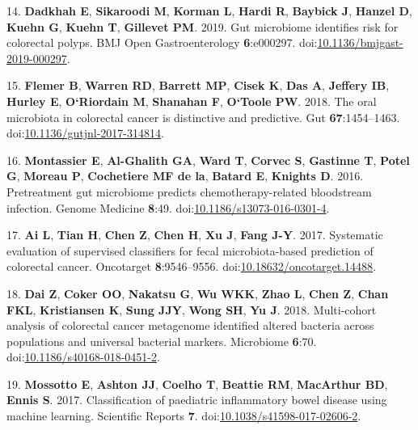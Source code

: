 \documentclass[11pt,]{article}
\begin{document}
\hypertarget{ref-dadkhah_gut_2019}{}
14. \textbf{Dadkhah E}, \textbf{Sikaroodi M}, \textbf{Korman L},
\textbf{Hardi R}, \textbf{Baybick J}, \textbf{Hanzel D}, \textbf{Kuehn
G}, \textbf{Kuehn T}, \textbf{Gillevet PM}. 2019. Gut microbiome
identifies risk for colorectal polyps. BMJ Open Gastroenterology
\textbf{6}:e000297.
doi:\href{https://doi.org/10.1136/bmjgast-2019-000297}{10.1136/bmjgast-2019-000297}.

\hypertarget{ref-flemer_oral_2018}{}
15. \textbf{Flemer B}, \textbf{Warren RD}, \textbf{Barrett MP},
\textbf{Cisek K}, \textbf{Das A}, \textbf{Jeffery IB}, \textbf{Hurley
E}, \textbf{O`Riordain M}, \textbf{Shanahan F}, \textbf{O`Toole PW}.
2018. The oral microbiota in colorectal cancer is distinctive and
predictive. Gut \textbf{67}:1454--1463.
doi:\href{https://doi.org/10.1136/gutjnl-2017-314814}{10.1136/gutjnl-2017-314814}.

\hypertarget{ref-montassier_pretreatment_2016}{}
16. \textbf{Montassier E}, \textbf{Al-Ghalith GA}, \textbf{Ward T},
\textbf{Corvec S}, \textbf{Gastinne T}, \textbf{Potel G}, \textbf{Moreau
P}, \textbf{Cochetiere MF de la}, \textbf{Batard E}, \textbf{Knights D}.
2016. Pretreatment gut microbiome predicts chemotherapy-related
bloodstream infection. Genome Medicine \textbf{8}:49.
doi:\href{https://doi.org/10.1186/s13073-016-0301-4}{10.1186/s13073-016-0301-4}.

\hypertarget{ref-ai_systematic_2017}{}
17. \textbf{Ai L}, \textbf{Tian H}, \textbf{Chen Z}, \textbf{Chen H},
\textbf{Xu J}, \textbf{Fang J-Y}. 2017. Systematic evaluation of
supervised classifiers for fecal microbiota-based prediction of
colorectal cancer. Oncotarget \textbf{8}:9546--9556.
doi:\href{https://doi.org/10.18632/oncotarget.14488}{10.18632/oncotarget.14488}.

\hypertarget{ref-dai_multi-cohort_2018}{}
18. \textbf{Dai Z}, \textbf{Coker OO}, \textbf{Nakatsu G}, \textbf{Wu
WKK}, \textbf{Zhao L}, \textbf{Chen Z}, \textbf{Chan FKL},
\textbf{Kristiansen K}, \textbf{Sung JJY}, \textbf{Wong SH}, \textbf{Yu
J}. 2018. Multi-cohort analysis of colorectal cancer metagenome
identified altered bacteria across populations and universal bacterial
markers. Microbiome \textbf{6}:70.
doi:\href{https://doi.org/10.1186/s40168-018-0451-2}{10.1186/s40168-018-0451-2}.

\hypertarget{ref-mossotto_classification_2017}{}
19. \textbf{Mossotto E}, \textbf{Ashton JJ}, \textbf{Coelho T},
\textbf{Beattie RM}, \textbf{MacArthur BD}, \textbf{Ennis S}. 2017.
Classification of paediatric inflammatory bowel disease using machine
learning. Scientific Reports \textbf{7}.
doi:\href{https://doi.org/10.1038/s41598-017-02606-2}{10.1038/s41598-017-02606-2}.
\end{document}
